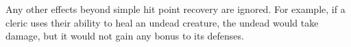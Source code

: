   Any other effects beyond simple hit point recovery are ignored.
  For example, if a cleric uses their  ability to heal an undead creature, the undead would take damage, but it would not gain any bonus to its defenses.

